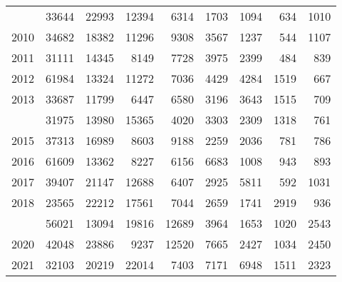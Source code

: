 \documentclass[
]{article}
\begin{document}
\begin{longtable}[t]{lrrrrrrrr}
\addlinespace
2009 & 33644 & 22993 & 12394 & 6314 & 1703 & 1094 & 634 & 1010\\
2010 & 34682 & 18382 & 11296 & 9308 & 3567 & 1237 & 544 & 1107\\
2011 & 31111 & 14345 & 8149 & 7728 & 3975 & 2399 & 484 & 839\\
2012 & 61984 & 13324 & 11272 & 7036 & 4429 & 4284 & 1519 & 667\\
2013 & 33687 & 11799 & 6447 & 6580 & 3196 & 3643 & 1515 & 709\\
\addlinespace
2014 & 31975 & 13980 & 15365 & 4020 & 3303 & 2309 & 1318 & 761\\
2015 & 37313 & 16989 & 8603 & 9188 & 2259 & 2036 & 781 & 786\\
2016 & 61609 & 13362 & 8227 & 6156 & 6683 & 1008 & 943 & 893\\
2017 & 39407 & 21147 & 12688 & 6407 & 2925 & 5811 & 592 & 1031\\
2018 & 23565 & 22212 & 17561 & 7044 & 2659 & 1741 & 2919 & 936\\
\addlinespace
2019 & 56021 & 13094 & 19816 & 12689 & 3964 & 1653 & 1020 & 2543\\
2020 & 42048 & 23886 & 9237 & 12520 & 7665 & 2427 & 1034 & 2450\\
2021 & 32103 & 20219 & 22014 & 7403 & 7171 & 6948 & 1511 & 2323\\*
\end{longtable}
\end{document}
